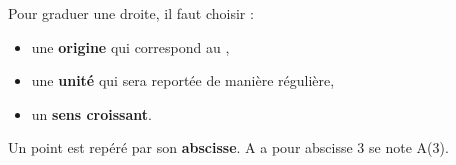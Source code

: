 \begin{defi*}{}{}
Pour graduer une droite, il faut choisir :
\begin{itemize}[label=$-$]
	\item une {\bf origine} qui correspond au  \fg{},
	\item une {\bf unité} qui sera reportée de manière régulière,
	\item un {\bf sens croissant}.
\end{itemize}
Un point est repéré par son {\bf abscisse}. A a pour abscisse 3 se note A(3).
\end{defi*}
